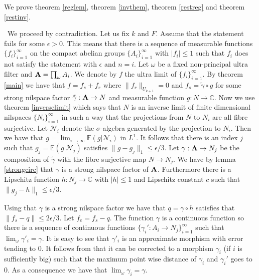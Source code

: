 \documentclass [11pt] {article}
\def\to{\rightarrow}
\def\bA{{\bf A}}
\begin{document}
We prove theorem \ref{reglem}, theorem \ref{invthem}, theorem \ref{restreg} and theorem \ref{restinv}.


~We proceed by contradiction. Let us fix $k$ and $F$. Assume that the statement fails for some $\epsilon>0$. 
This means that there is a sequence of measurable functions $\{f_i\}_{i=1}^\infty$ on the compact abelian groups $\{A_i\}_{i=1}^\infty$ with $|f_i|\leq 1$ such that $f_i$ does not satisfy the statement with $\epsilon$ and $n=i$. Let $\omega$ be a fixed non-principal ultra filter and $\bA=\prod_\omega A_i$.
We denote by $f$ the ultra limit of $\{f_i\}_{i=1}^\infty$.
By theorem \ref{main} we have that $f=f_s+f_r$ where $\|f_r\|_{U_{k+1}}=0$ and $f_s=\tilde{\gamma}\circ g$ for some strong nilspace factor $\tilde{\gamma}:\bA\rightarrow N$ and measurable function $g:N\rightarrow\mathbb{C}$.
Now we use theorem \ref{inverselimit} which says that $N$ is an inverse limit of finite dimensional nilspaces $\{N_i\}_{i=1}^\infty$ in such a way that the projections from $N$ to $N_i$ are all fibre surjective.
Let $\mathcal{N}_i$ denote the $\sigma$-algebra generated by the projection to $N_i$. Then we have that 
$g=\lim_{i\to\infty}\mathbb{E}(g|\mathcal{N}_i)$ in $L^1$.
It follows that there is an index $j$ such that
$g_j=\mathbb{E}(g|\mathcal{N}_j)$ satisfies $\|g-g_j\|_1\leq\epsilon/3$.
Let $\gamma:\bA\rightarrow N_j$ be the composition of $\tilde{\gamma}$ with the fibre surjective map $N\rightarrow N_j$. 
We have by lemma \ref{strongcirc} that $\gamma$ is a strong nilspace factor of $\bA$. 
Furthermore there is a Lipschitz function $h:N_j\rightarrow\mathbb{C}$ with $|h|\leq 1$ and Lipschitz constant $c$ such that $\|g_j-h\|_1\leq\epsilon/3$.

Using that $\gamma$ is a strong nilspace factor we have that $q=\gamma\circ h$ satisfies that $\|f_s-q\|\leq 2\epsilon/3$.
Let $f_e=f_s-q$. 
The function $\gamma$ is a continuous function so there is a sequence of continuous functions $\{\gamma_i':A_i\rightarrow N_j\}_{i=1}^\infty$ such that $\lim_{\omega}\gamma'_i=\gamma$. It is easy to see that $\gamma'_i$ is an approximate morphism with error tending to $0$.
It follows from \cite{NP} that it can be corrected to a morphism $\gamma_i$ (if $i$ is sufficiently big) such that the maximum point wise distance of $\gamma_i$ and $\gamma_i'$ goes to $0$. As a consequence we have that $\lim_\omega\gamma_i=\gamma$.
\end{document}
